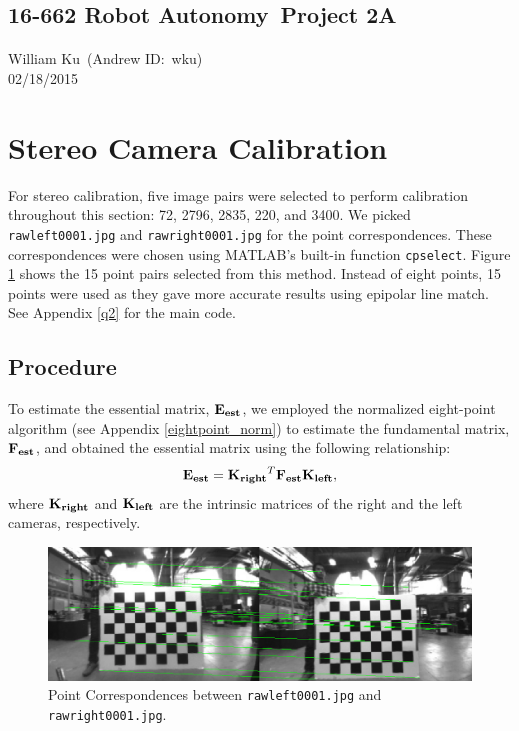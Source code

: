 \documentclass[12pt]{article} %
\def\Name{William Ku}  %
\def\ID{wku}  %
\def\Date{02/18/2015} %
\def\Class{16-662 Robot Autonomy} %
\def\Proj{2A} %
\begin{document}
\begin{center}
	\subsection*{\Class\ Project \Proj}
	\paragraph{} \Name\ (Andrew ID:\ \ID)\\\Date
\end{center}


\section{}


\section{Stereo Camera Calibration}
For stereo calibration, five image pairs were selected to perform calibration throughout this section: 72, 2796, 2835, 220, and 3400. We picked {\tt rawleft0001.jpg} and {\tt rawright0001.jpg} for the point correspondences. These correspondences were chosen using MATLAB's built-in function {\tt cpselect}. Figure \ref{corr} shows the 15 point pairs selected from this method. Instead of eight points, 15 points were used as they gave more accurate results using epipolar line match. See Appendix \ref{q2} for the main code.\\

\subsection{Procedure}
To estimate the essential matrix, $ {\bf E_{est}}$, we employed the normalized eight-point algorithm (see Appendix \ref{eightpoint_norm}) to estimate the fundamental matrix, ${\bf F_{est}}$, and obtained the essential matrix using the following relationship:
\begin{equation*}
	\begin{aligned}
		{\bf E_{est}} = {\bf K_{right}}^T{\bf F_{est}}{\bf K_{left}},
	\end{aligned}
\end{equation*}
where ${\bf K_{right}}$ and ${\bf K_{left}}$ are the intrinsic matrices of the right and the left cameras, respectively.
\begin{figure}[b]
	\centering
	\includegraphics[width=450px]{corr.png}
	\caption{Point Correspondences between {\tt rawleft0001.jpg} and {\tt rawright0001.jpg}.}
	\label{corr}
\end{figure}
\end{document}
